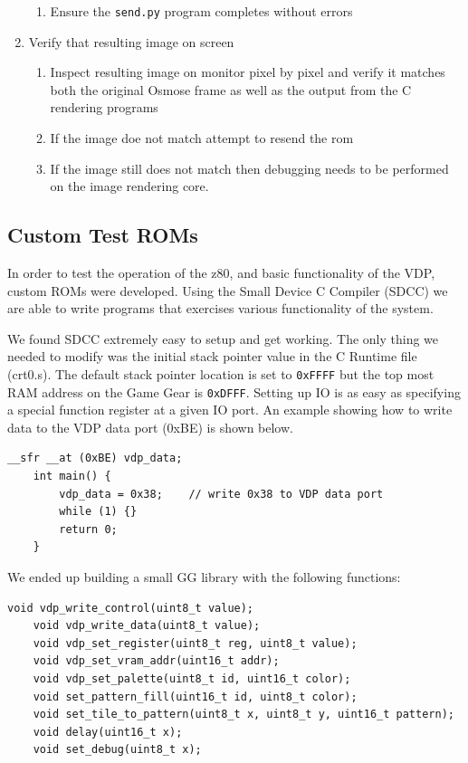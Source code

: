 \documentclass{article}
\begin{document}
\begin{enumerate}
\begin{enumerate}
            \item Ensure the \texttt{send.py} program completes without errors
        \end{enumerate}
    \item Verify that resulting image on screen
        \begin{enumerate}
            \item Inspect resulting image on monitor pixel by pixel and verify it matches both the original Osmose frame as well as the output from the C rendering programs
            \item If the image doe not match attempt to resend the rom
            \item If the image still does not match then debugging needs to be performed on the image rendering core.
        \end{enumerate}
\end{enumerate}

\subsection{Custom Test ROMs}

In order to test the operation of the z80, and basic functionality of the VDP,
custom ROMs were developed. Using the Small Device C Compiler (SDCC)
\cite{SDCC} we are able to write programs that exercises various functionality
of the system.

We found SDCC extremely easy to setup and get working. The only thing
we needed to modify was the initial stack pointer value in the C
Runtime file (crt0.s). The default stack pointer location is set to
\texttt{0xFFFF} but the top most RAM address on the Game Gear is
\texttt{0xDFFF}. Setting up IO is as easy as specifying a special
function register at a given IO port. An example showing how to write
data to the VDP data port (0xBE) is shown below.

\begin{lstlisting}[caption=VDP Data Write]
    __sfr __at (0xBE) vdp_data;
    int main() {
        vdp_data = 0x38;    // write 0x38 to VDP data port
        while (1) {}
        return 0;
    }
\end{lstlisting}

We ended up building a small GG library with the following functions:

\begin{lstlisting}[caption=Game Gear Library Functions]
    void vdp_write_control(uint8_t value);
    void vdp_write_data(uint8_t value);
    void vdp_set_register(uint8_t reg, uint8_t value);
    void vdp_set_vram_addr(uint16_t addr);
    void vdp_set_palette(uint8_t id, uint16_t color);
    void set_pattern_fill(uint16_t id, uint8_t color);
    void set_tile_to_pattern(uint8_t x, uint8_t y, uint16_t pattern);
    void delay(uint16_t x);
    void set_debug(uint8_t x);
\end{lstlisting}
\end{document}
